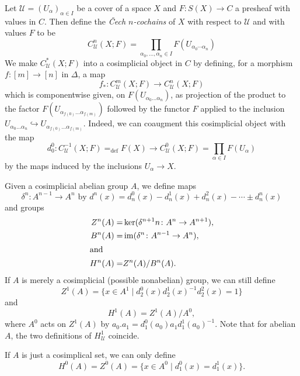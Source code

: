 \documentclass[a4paper,openany]{scrbook}
\begin{document}
\begin{defn}
Let $\mathcal U=(U_\alpha)_{\alpha \in I}$ be a cover of a space $X$ and $F\colon S(X) \to C$ a presheaf with values in $C$. Then define the \emph{Čech $n$-cochains} of $X$ with respect to $\mathcal U$ and with values $F$ to be
\[
C^n_{\mathcal U}(X;F) =  \prod_{\alpha_0,\dots,\alpha_n \in I} F(U_{\alpha_0\cdots\alpha_n})
\]
We make $C^*_{\mathcal U}(X;F)$ into a cosimplicial object in $C$ by defining, for a morphism $f\colon [m] \to [n]$ in $\Delta$, a map
\[
f_*\colon C^m_{\mathcal U}(X;F) \to C^n_{\mathcal U}(X;F)
\]
which is componentwise given, on $F(U_{\alpha_0\dots\alpha_n})$, as projection of the product to the factor $F(U_{\alpha_{f(0)}\dots \alpha_{f(m)}})$ followed by the functor $F$ applied to the inclusion $U_{\alpha_0\dots\alpha_n} \hookrightarrow U_{\alpha_{f(0)}\dots \alpha_{f(m)}}$. Indeed, we can coaugment this cosimplicial object with the map
\[
d_0^0\colon C^{-1}_{\mathcal U}(X;F) =_{\operatorname{def}} F(X) \to C^0_{\mathcal U}(X;F) = \prod_{\alpha \in I} F(U_\alpha)
\]
by the maps induced by the inclusions $U_\alpha \to X$.
\end{defn}



\begin{defn}
Given a cosimplicial abelian group $A$, we define maps
\[
\delta^n\colon A^{n-1} \to A^{n} \text{ by } d^n(x) = d^0_{n}(x)-d^1_{n}(x)+d^2_{n}(x)-\cdots\pm d^{n}_{n}(x)
\]
and groups
\begin{align*}
Z^n(A) =& \ker(\delta^{n+1}n\colon A^n \to A^{n+1}),\\
B^n(A) =& \operatorname{im}(\delta^{n}\colon A^{n-1} \to A^{n}),\\
\intertext{and}
H^n(A) =& Z^n(A)/B^n(A).
\end{align*}
If $A$ is merely a cosimplicial (possible nonabelian) group, we can still define
\[
Z^1(A) = \{x \in A^1 \mid d^0_2(x)d^1_2(x)^{-1}d^2_2(x)=1\}
\]
and
\[
H^1(A) = Z^1(A)/A^0,
\]
where $A^0$ acts on $Z^1(A)$ by $a_0.a_1 = d^0_1(a_0) a_1 d^1_1(a_0)^{-1}$. Note that for abelian $A$, the two definitions of $H^1_{\mathcal U}$ coincide.

If $A$ is just a cosimplical set, we can only define
\[
H^0(A) = Z^0(A) = \{x \in A^0 \mid d^0_1(x) = d^1_1(x)\}.
\]
\end{defn}
\end{document}
